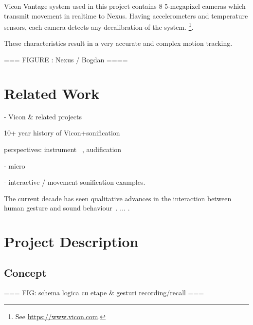 \documentclass{nime-alternate}
\begin{document}
Vicon Vantage system used in this project contains 8 5-megapixel cameras which transmit movement in realtime to Nexus. Having accelerometers and temperature sensors, each camera detects any decalibration of the system. \footnote{See  \url{https://www.vicon.com}.}.

These characteristics result in a very accurate and complex motion tracking.

=== FIGURE : Nexus / Bogdan ====


\section{Related Work}

- Vicon \& related projects



10+ year history of Vicon+sonification


perspectives: instrument ~\cite{nymoen2011soundsaber}, audification~\cite{dobrian2003gestural,kapur2005framework}


- micro

\cite{worrall2013understanding}

- interactive / movement sonification examples\cite{hermann2011sonification}.



The current decade has seen qualitative advances in the interaction between human gesture and sound behaviour~\cite{Gestureanalysis}. ... \cite{probabilisticmodels}.

\section{Project Description}

\subsection{Concept}

=== FIG: schema logica cu etape \& gesturi recording/recall ===
\end{document}
